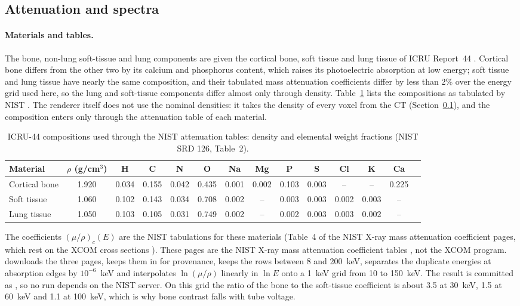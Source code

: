 \subsection{Attenuation and spectra}
\label{ssec:dp-atten}
\paragraph{Materials and tables.} The bone, non-lung soft-tissue and lung components are given the cortical bone, soft tissue and lung tissue of
ICRU Report~44 \citep{icru1989report44}. Cortical bone differs from the other two by its calcium and phosphorus content, which raises its
photoelectric absorption at low energy; soft tissue and lung tissue have nearly the same composition, and their tabulated mass attenuation
coefficients differ by less than 2\% over the energy grid used here, so the lung and soft-tissue components differ almost only through density.
Table~\ref{tab:icru44} lists the compositions as tabulated by NIST \citep{hubbell2004xraymass}. The renderer itself does not use the nominal
densities: it takes the density of every voxel from the CT (Section~\ref{ssec:dp-atten}), and the composition enters only through the
attenuation table of each material.
\begin{table}[htbp]
\centering\small
\caption{ICRU-44 compositions used through the NIST attenuation tables: density and elemental weight fractions (NIST SRD 126, Table~2).}
\label{tab:icru44}
\begin{adjustbox}{max width=\linewidth}\begin{tabular}{@{}lccccccccccccc@{}}
\toprule
Material & $\rho$ (g/cm$^3$) & H & C & N & O & Na & Mg & P & S & Cl & K & Ca \\
\midrule
Cortical bone & 1.920 & 0.034 & 0.155 & 0.042 & 0.435 & 0.001 & 0.002 & 0.103 & 0.003 & -- & -- & 0.225 \\
Soft tissue & 1.060 & 0.102 & 0.143 & 0.034 & 0.708 & 0.002 & -- & 0.003 & 0.003 & 0.002 & 0.003 & -- \\
Lung tissue & 1.050 & 0.103 & 0.105 & 0.031 & 0.749 & 0.002 & -- & 0.002 & 0.003 & 0.003 & 0.002 & -- \\
\bottomrule
\end{tabular}\end{adjustbox}
\end{table}
The coefficients $(\mu/\rho)_c(E)$ are the NIST tabulations for these materials (Table~4 of the NIST X-ray mass attenuation coefficient pages,
which rest on the XCOM cross sections \citep{berger2010xcom}).
These pages are the NIST X-ray mass attenuation coefficient tables \citep{hubbell2004xraymass}, not the XCOM program.
 downloads the three pages, keeps them in  for provenance, keeps the rows between 8
and 200~keV, separates the duplicate energies at absorption edges by $10^{-6}$~keV and interpolates $\ln(\mu/\rho)$ linearly in $\ln E$ onto a
1~keV grid from 10 to 150~keV. The result is committed as , so no run depends on the NIST server. On this grid
the ratio of the bone to the soft-tissue coefficient is about 3.5 at 30~keV, 1.5 at 60~keV and 1.1 at 100~keV, which is why bone contrast falls
with tube voltage.

